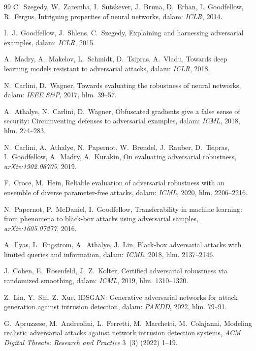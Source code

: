\documentclass[11pt,a4paper]{article}
\begin{document}
\begin{thebibliography}{99}
 C.~Szegedy, W.~Zaremba, I.~Sutskever, J.~Bruna, D.~Erhan,
I.~Goodfellow, R.~Fergus, Intriguing properties of neural networks, dalam:
\emph{ICLR}, 2014.

 I.~J.~Goodfellow, J.~Shlens, C.~Szegedy, Explaining and
harnessing adversarial examples, dalam: \emph{ICLR}, 2015.

 A.~Madry, A.~Makelov, L.~Schmidt, D.~Tsipras, A.~Vladu, Towards
deep learning models resistant to adversarial attacks, dalam: \emph{ICLR}, 2018.

 N.~Carlini, D.~Wagner, Towards evaluating the robustness of
neural networks, dalam: \emph{IEEE S\&P}, 2017, hlm. 39--57.

 A.~Athalye, N.~Carlini, D.~Wagner, Obfuscated gradients give
a false sense of security: Circumventing defenses to adversarial examples, dalam:
\emph{ICML}, 2018, hlm. 274--283.

 N.~Carlini, A.~Athalye, N.~Papernot, W.~Brendel,
J.~Rauber, D.~Tsipras, I.~Goodfellow, A.~Madry, A.~Kurakin, On evaluating
adversarial robustness, \emph{arXiv:1902.06705}, 2019.

 F.~Croce, M.~Hein, Reliable evaluation of adversarial
robustness with an ensemble of diverse parameter-free attacks, dalam: \emph{ICML},
2020, hlm. 2206--2216.

 N.~Papernot, P.~McDaniel, I.~Goodfellow,
Transferability in machine learning: from phenomena to black-box attacks using
adversarial samples, \emph{arXiv:1605.07277}, 2016.

 A.~Ilyas, L.~Engstrom, A.~Athalye, J.~Lin, Black-box
adversarial attacks with limited queries and information, dalam: \emph{ICML}, 2018,
hlm. 2137--2146.

 J.~Cohen, E.~Rosenfeld, J.~Z.~Kolter, Certified
adversarial robustness via randomized smoothing, dalam: \emph{ICML}, 2019, hlm.
1310--1320.

 Z.~Lin, Y.~Shi, Z.~Xue, IDSGAN: Generative adversarial
networks for attack generation against intrusion detection, dalam: \emph{PAKDD},
2022, hlm. 79--91.

 G.~Apruzzese, M.~Andreolini, L.~Ferretti, M.~Marchetti,
M.~Colajanni, Modeling realistic adversarial attacks against network intrusion
detection systems, \emph{ACM Digital Threats: Research and Practice} 3~(3) (2022)
1--19.


\end{thebibliography}
\end{document}

